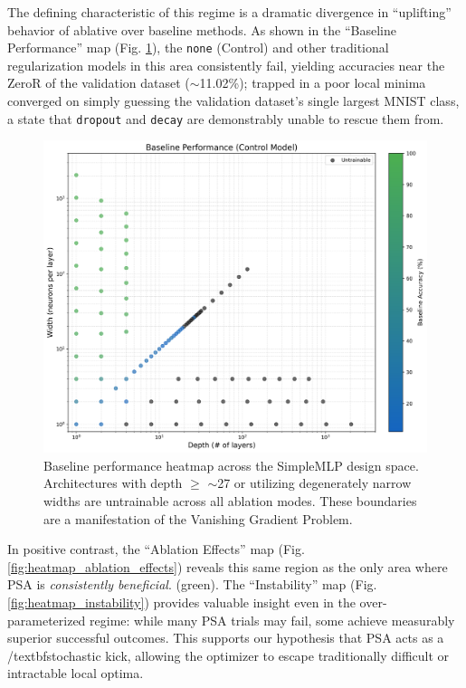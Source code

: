 \documentclass[conference]{IEEEtran}
\begin{document}
The defining characteristic of this regime is a dramatic divergence in ``uplifting'' behavior of ablative over baseline methods. As shown in the ``Baseline Performance'' map (Fig. \ref{fig:heatmap_baseline}), the \verb|none| (Control) and other traditional regularization models in this area consistently fail, yielding accuracies near the ZeroR of the validation dataset ($\sim$11.02\%); trapped in a poor local minima converged on simply guessing the validation dataset's single largest MNIST class, a state that \verb|dropout| and \verb|decay| are demonstrably unable to rescue them from.

\begin{figure}[ht]
\centering
\includegraphics[width=\linewidth]{SimpleMLP_Heatmap_Baseline_Performance.png}
\caption{Baseline performance heatmap across the SimpleMLP design space. Architectures with depth $\geq$ $\sim$27 or utilizing degenerately narrow widths are untrainable across all ablation modes. These boundaries are a manifestation of the Vanishing Gradient Problem.}
\label{fig:heatmap_baseline}
\end{figure}

In positive contrast, the ``Ablation Effects'' map (Fig. \ref{fig:heatmap_ablation_effects}) reveals this same region as the only area where PSA is \textit{consistently beneficial}. (green). The ``Instability'' map (Fig. \ref{fig:heatmap_instability}) provides valuable insight even in the over-parameterized regime: while many PSA trials may fail, some achieve measurably superior successful outcomes. This supports our hypothesis that PSA acts as a /textbf{stochastic kick}, allowing the optimizer to escape traditionally difficult or intractable local optima.
\end{document}
